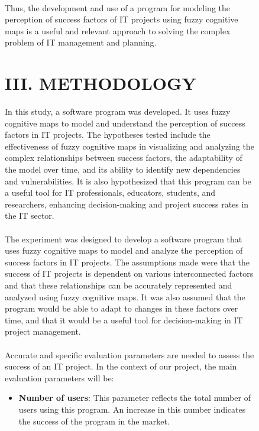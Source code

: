 \documentclass{article}
\begin{document}
    \newpage
    \begin{figure}[!t]
        \fontsize{8}{7}\selectfont
        \begin{minipage}{0.49\textwidth}
            ~\\
            Thus, the development and use of a program for modeling the perception of success factors of IT projects using fuzzy cognitive maps is a useful and relevant approach to solving the complex problem of IT management and planning.\\
            \begin{center}
                \chapter{III. METHODOLOGY}
            \end{center}
            In this study, a software program was developed. It uses fuzzy cognitive maps to model and understand the perception of success factors in IT projects. The hypotheses tested include the effectiveness of fuzzy cognitive maps in visualizing and analyzing the complex relationships between success factors, the adaptability of the model over time, and its ability to identify new dependencies and vulnerabilities. It is also hypothesized that this program can be a useful tool for IT professionals, educators, students, and researchers, enhancing decision-making and project success rates in the IT sector.\\
            ~\\
            The experiment was designed to develop a software program that uses fuzzy cognitive maps to model and analyze the perception of success factors in IT projects. The assumptions made were that the success of IT projects is dependent on various interconnected factors and that these relationships can be accurately represented and analyzed using fuzzy cognitive maps. It was also assumed that the program would be able to adapt to changes in these factors over time, and that it would be a useful tool for decision-making in IT project management.\\
            ~\\
            Accurate and specific evaluation parameters are needed to assess the success of an IT project. In the context of our project, the main evaluation parameters will be:
            \begin{itemize}
                \item \textbf{Number of users}: This parameter reflects the total number of users using this program. An increase in this number indicates the success of the program in the market.

\end{itemize}
\end{minipage}
\end{figure}
\end{document}

